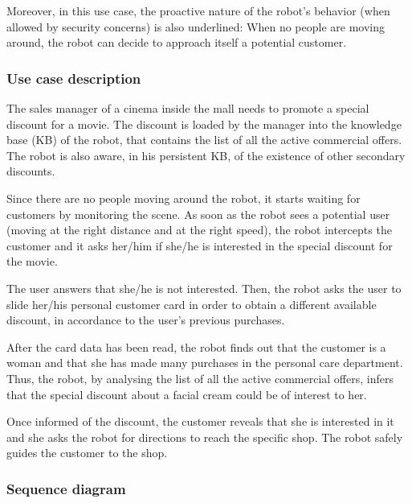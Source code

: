Moreover, in this use case, the proactive nature of the robot's behavior (when allowed by security
concerns) is also underlined: When no people are
moving around, the robot can decide to approach itself a potential
customer.

\subsubsection{Use case description}

The sales manager of a cinema inside the mall needs to promote a special discount
for a movie. The discount is loaded by the manager into the 
knowledge base (KB) of the robot, that contains the list of all the active commercial offers.
The robot is also aware, in his persistent KB, of the
existence of other secondary discounts.

Since there are no people moving around the robot, it starts
waiting for customers by monitoring the scene. As soon as the robot
sees a potential user (moving at the right distance and at the right speed),
the robot intercepts the customer and it asks her/him if she/he is interested
in the special discount for the movie.

The user answers that she/he is not interested.
Then, the robot asks the user to slide her/his personal customer card in order to
obtain a different available discount, in accordance to the user's previous purchases.

After the card data has been read, the robot finds out that the customer is a woman and that she
has made many purchases in the personal care department. 
Thus, the robot, by analysing the list of all the active commercial offers,
infers that the special discount about a facial cream could be of interest
to her.

Once informed of the discount, the customer reveals
that she is interested in it and she asks the robot for directions to reach the specific
shop. The robot safely guides the customer to the shop.

\newpage

\subsubsection{Sequence diagram}

